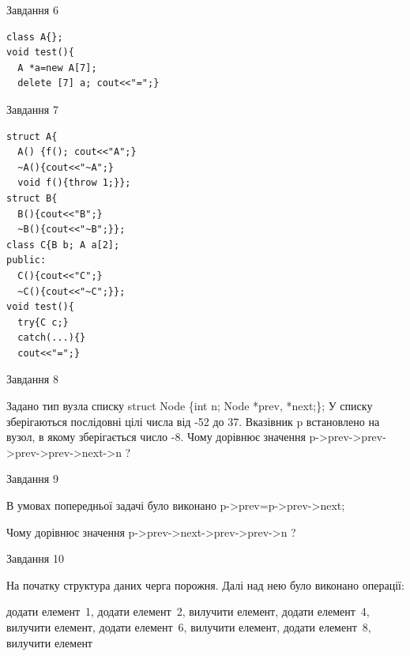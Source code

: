 \documentclass[12pt, ukrainian]{article}
\begin{document}
{{{{{{{\begin{minipage}[t]{7cm}
               
{\begin{center}Завдання {6}\end{center}}
\vspace{-6mm}

\begin{verbatim}
class A{};
void test(){
  A *a=new A[7]; 
  delete [7] a; cout<<"=";}
\end{verbatim}            


               
{\begin{center}Завдання {7}\end{center}}
\vspace{-6mm}

\begin{verbatim}
struct A{
  A() {f(); cout<<"A";}
  ~A(){cout<<"~A";} 
  void f(){throw 1;}};
struct B{
  B(){cout<<"B";}
  ~B(){cout<<"~B";}};
class C{B b; A a[2];
public:
  C(){cout<<"C";}
  ~C(){cout<<"~C";}};
void test(){
  try{C c;} 
  catch(...){} 
  cout<<"=";}
\end{verbatim}            


\end{minipage}
               
{\begin{center}Завдання {8}\end{center}}
\vspace{-6mm}
Задано тип вузла списку
struct Node \{int n; Node *prev, *next;\};
У списку зберігаються послідовні цілі числа від -52 до 37. Вказівник p встановлено на вузол, в якому зберігається число -8.
Чому дорівнює значення p->prev->prev->prev->prev->next->n ?\par

               
{\begin{center}Завдання {9}\end{center}}
\vspace{-6mm}
В умовах попередньої задачі було виконано p->prev=p->prev->next;

Чому дорівнює значення p->prev->next->prev->prev->n ?\par

\newpage
               
{\begin{center}Завдання {10}\end{center}}
\vspace{-6mm}
На початку структура даних черга порожня. Далі над нею було виконано операції:

додати елемент~1, додати елемент~2, вилучити елемент, додати елемент~4, вилучити елемент, додати елемент~6, вилучити елемент, додати елемент~8, вилучити елемент

}}}}}}}
\end{document}
